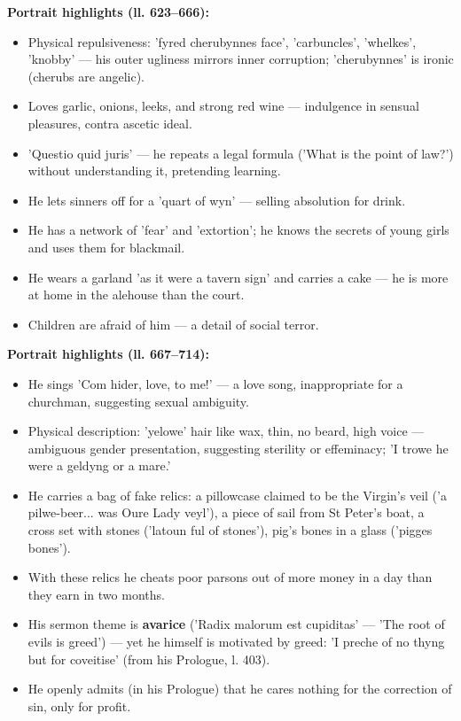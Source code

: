 \documentclass[11pt]{article}
\begin{document}
\begin{propriete}
\textbf{Portrait highlights (ll. 623–666):}
\begin{itemize}
\item Physical repulsiveness: 'fyred cherubynnes face', 'carbuncles', 'whelkes', 'knobby' — his outer ugliness mirrors inner corruption; 'cherubynnes' is ironic (cherubs are angelic).
\item Loves garlic, onions, leeks, and strong red wine — indulgence in sensual pleasures, contra ascetic ideal.
\item 'Questio quid juris' — he repeats a legal formula ('What is the point of law?') without understanding it, pretending learning.
\item He lets sinners off for a 'quart of wyn' — selling absolution for drink.
\item He has a network of 'fear' and 'extortion'; he knows the secrets of young girls and uses them for blackmail.
\item He wears a garland 'as it were a tavern sign' and carries a cake — he is more at home in the alehouse than the court.
\item Children are afraid of him — a detail of social terror.
\end{itemize}
\end{propriete}

\begin{propriete}
\textbf{Portrait highlights (ll. 667–714):}
\begin{itemize}
\item He sings 'Com hider, love, to me!' — a love song, inappropriate for a churchman, suggesting sexual ambiguity.
\item Physical description: 'yelowe' hair like wax, thin, no beard, high voice — ambiguous gender presentation, suggesting sterility or effeminacy; 'I trowe he were a geldyng or a mare.'
\item He carries a bag of fake relics: a pillowcase claimed to be the Virgin's veil ('a pilwe-beer... was Oure Lady veyl'), a piece of sail from St Peter's boat, a cross set with stones ('latoun ful of stones'), pig's bones in a glass ('pigges bones').
\item With these relics he cheats poor parsons out of more money in a day than they earn in two months.
\item His sermon theme is \textbf{avarice} ('Radix malorum est cupiditas' — 'The root of evils is greed') — yet he himself is motivated by greed: 'I preche of no thyng but for coveitise' (from his Prologue, l. 403).
\item He openly admits (in his Prologue) that he cares nothing for the correction of sin, only for profit.
\end{itemize}
\end{propriete}
\end{document}
